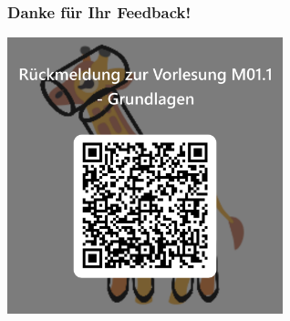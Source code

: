 \documentclass{beamer}
\begin{document}
\begin{frame}
\frametitle{Danke für Ihr Feedback!}



\begin{center}
    \includegraphics[width=0.6\textwidth]{feedback_QR.png}
\end{center}

\end{frame}
\end{document}
